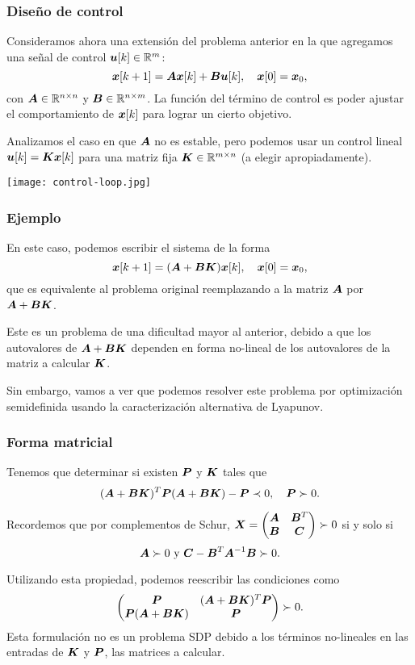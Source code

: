 \documentclass[aspectratio=169,12pt,spanish]{beamer}
\begin{document}
\begin{frame}
\frametitle{Diseño de control}

Consideramos ahora una extensión del problema anterior en la que agregamos una señal de control $\bm{u}[k] \in \mathbb{R}^{m}$:
$$
\bm{x}[k+1] = \bm{A}\bm{x}[k] + \bm{B}\bm{u}[k], \quad \bm{x}[0] = \bm{x}_0,
$$
con $\bm{A} \in \mathbb{R}^{n \times n}$ y $\bm{B} \in \mathbb{R}^{n \times m}$.
La función del término de control es poder ajustar el comportamiento de $\bm{x}[k]$ para lograr un cierto objetivo.

Analizamos  el caso en que $\bm{A}$ no es estable, pero podemos usar un control lineal $\bm{u}[k] = \bm{K}\bm{x}[k]$ para una matriz fija $\bm{K} \in \mathbb{R}^{m \times n}$ (a elegir apropiadamente).

\begin{center}
\texttt{[image: control-loop.jpg]}
\end{center}


\end{frame}


\begin{frame}
\frametitle{Ejemplo}

En este caso, podemos escribir el sistema de la forma
$$
\bm{x}[k+1] = (\bm{A} + \bm{B}\bm{K})\bm{x}[k], \quad \bm{x}[0] = \bm{x}_0,
$$
que es equivalente al problema original reemplazando a la matriz $\bm{A}$ por $\bm{A}+\bm{B}\bm{K}$.

Este es un problema de una dificultad mayor al anterior, debido a que los autovalores de $\bm{A} + \bm{B}\bm{K}$ dependen en forma no-lineal de los autovalores de la matriz a calcular $\bm{K}$.

Sin embargo, vamos a ver que podemos resolver este problema por optimización semidefinida usando la caracterización alternativa de Lyapunov.

\end{frame}


\begin{frame}
\frametitle{Forma matricial}

Tenemos que determinar si existen $\bm{P}$ y $\bm{K}$ tales que
$$
(\bm{A}+\bm{B}\bm{K})^T \bm{P} (\bm{A} + \bm{B}\bm{K}) - \bm{P} \prec 0, \quad \bm{P} \succ 0.
$$

Recordemos que por complementos de Schur, $\bm{X} = \begin{pmatrix} \bm{A} & \bm{B}^T \\ \bm{B} & \bm{C} \end{pmatrix} \succ 0$ si y solo si
$$\bm{A} \succ 0 \text{ y }  \bm{C} - \bm{B}^T \bm{A}^{-1} \bm{B} \succ 0.$$

Utilizando esta propiedad, podemos reescribir las condiciones como \pause
$$
\begin{pmatrix}
\bm{P} & (\bm{A}+\bm{B}\bm{K})^T \bm{P} \\
\bm{P}(\bm{A}+\bm{B}\bm{K}) & \bm{P}
\end{pmatrix} \succ 0.
$$
Esta formulación no es un problema SDP debido a los términos no-lineales en las entradas de  $\bm{K}$ y $\bm{P}$, las matrices a calcular.


\end{frame}
\end{document}
